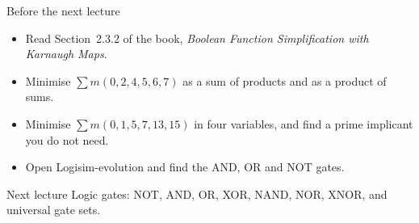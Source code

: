 \documentclass[10pt]{wosm-slides}
\begin{document}
\begin{frame}{Before the next lecture}
  \begin{itemize}
    \item Read Section~2.3.2 of the book, \emph{Boolean Function Simplification with
      Karnaugh Maps}.
    \item Minimise $\sum m(0, 2, 4, 5, 6, 7)$ as a sum of products and as a product
      of sums.
    \item Minimise $\sum m(0, 1, 5, 7, 13, 15)$ in four variables, and find a
      prime implicant you do not need.
    \item Open Logisim-evolution and find the AND, OR and NOT gates.
  \end{itemize}

  \begin{block}{Next lecture }
    Logic gates: NOT, AND, OR, XOR, NAND, NOR, XNOR, and universal gate sets.
  \end{block}
\end{frame}
\end{document}
